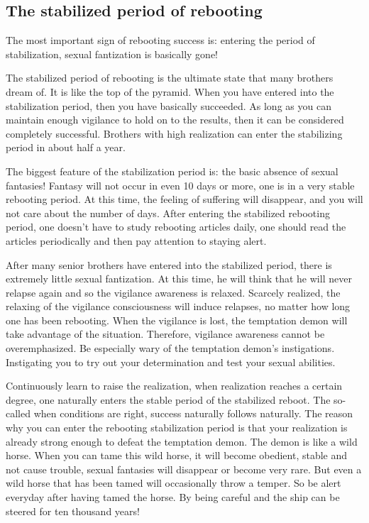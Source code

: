 \documentclass[
]{book}
\begin{document}
\hypertarget{the-stabilized-period-of-rebooting}{%
\subsection{The stabilized period of rebooting}\label{the-stabilized-period-of-rebooting}}

The most important sign of rebooting success is: entering the period of stabilization, sexual fantization is basically gone!

The stabilized period of rebooting is the ultimate state that many brothers dream of. It is like the top of the pyramid. When you have entered into the stabilization period, then you have basically succeeded. As long as you can maintain enough vigilance to hold on to the results, then it can be considered completely successful. Brothers with high realization can enter the stabilizing period in about half a year.

The biggest feature of the stabilization period is: the basic absence of sexual fantasies! Fantasy will not occur in even 10 days or more, one is in a very stable rebooting period. At this time, the feeling of suffering will disappear, and you will not care about the number of days. After entering the stabilized rebooting period, one doesn't have to study rebooting articles daily, one should read the articles periodically and then pay attention to staying alert.

After many senior brothers have entered into the stabilized period, there is extremely little sexual fantization. At this time, he will think that he will never relapse again and so the vigilance awareness is relaxed. Scarcely realized, the relaxing of the vigilance consciousness will induce relapses, no matter how long one has been rebooting. When the vigilance is lost, the temptation demon will take advantage of the situation. Therefore, vigilance awareness cannot be overemphasized. Be especially wary of the temptation demon's instigations. Instigating you to try out your determination and test your sexual abilities.

Continuously learn to raise the realization, when realization reaches a certain degree, one naturally enters the stable period of the stabilized reboot. The so-called when conditions are right, success naturally follows naturally. The reason why you can enter the rebooting stabilization period is that your realization is already strong enough to defeat the temptation demon. The demon is like a wild horse. When you can tame this wild horse, it will become obedient, stable and not cause trouble, sexual fantasies will disappear or become very rare. But even a wild horse that has been tamed will occasionally throw a temper. So be alert everyday after having tamed the horse. By being careful and the ship can be steered for ten thousand years!
\end{document}
